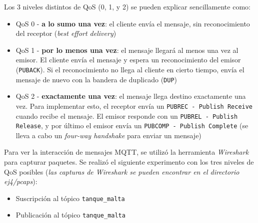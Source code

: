 Los 3 niveles distintos de QoS (0, 1, y 2) se pueden explicar sencillamente como:

\begin{itemize}
    \item QoS 0 - \textbf{a lo sumo una vez}: el cliente envía el mensaje, sin reconocimiento del receptor (\emph{best effort delivery}) 
    \item QoS 1 - \textbf{por lo menos una vez}: el mensaje llegará al menos una vez al emisor. El cliente envía el mensaje y espera un reconocimiento del emisor (\texttt{PUBACK}). Si el reconocimiento no llega al cliente en cierto tiempo, envía el mensaje de nuevo con la bandera de duplicado (\texttt{DUP})
    \item QoS 2 - \textbf{exactamente una vez}: el mensaje llega destino exactamente una vez. Para implementar esto, el receptor envía un \texttt{PUBREC - Publish Receive} cuando recibe el mensaje. El emisor responde con un \texttt{PUBREL - Publish Release}, y por último el emisor envía un \texttt{PUBCOMP - Publish Complete} (se lleva a cabo un \emph{four-way handshake} para enviar un mensaje)    
\end{itemize}

Para ver la interacción de mensajes MQTT, se utilizó la herramienta \emph{Wireshark} para capturar paquetes. Se realizó el siguiente experimento con los tres niveles de QoS posibles (\emph{las capturas de \emph{Wireshark} se pueden encontrar en el directorio ej4/pcaps}):

\begin{itemize}
    \item Suscripción al tópico \texttt{tanque\_malta} 
    \item Publicación al tópico \texttt{tanque\_malta} 
\end{itemize}




\clearpage
\printbibliography


